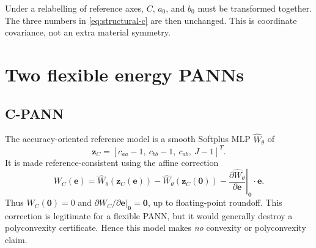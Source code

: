 \documentclass[10pt,a4paper]{article}
\begin{document}
Under a relabelling of reference axes, $C$, $a_0$, and $b_0$ must be
transformed together.  The three numbers in \eqref{eq:structural-c} are then
unchanged.  This is coordinate covariance, not an extra material symmetry.

\section{Two flexible energy PANNs}
\label{sec:flexible}
\subsection{C-PANN}
The accuracy-oriented reference model is a smooth Softplus MLP
$\widehat W_\theta$ of
\begin{equation}
 \bm z_C=[c_{aa}-1,\ c_{bb}-1,\ c_{ab},\ J-1]^T.
\end{equation}
It is made reference-consistent using the affine correction
\begin{equation}
 W_C(\bm e)=\widehat W_\theta(\bm z_C(\bm e))-
 \widehat W_\theta(\bm z_C(\bm0))-
 \left.\frac{\partial\widehat W_\theta}{\partial\bm e}\right|_{\bm0}\!\cdot\bm e.
 \label{eq:c-pann}
\end{equation}
Thus $W_C(\bm0)=0$ and $\partial W_C/\partial\bm e|_{\bm0}=\bm0$, up to
floating-point roundoff.  This correction is legitimate for a flexible PANN,
but it would generally destroy a polyconvexity certificate.  Hence this model
makes \emph{no} convexity or polyconvexity claim.
\end{document}
